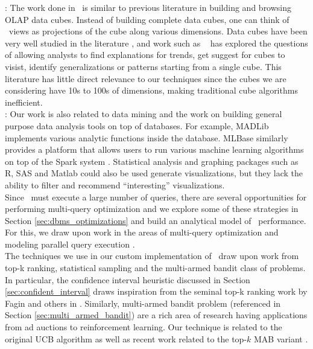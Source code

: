 :
The work done in \VizRecDB\ is similar to previous literature in
building and browsing OLAP data cubes. 
Instead of building complete data cubes,
one can think of \VizRecDB\ views as projections of the cube along various
dimensions.
 Data cubes have been very well studied in the literature
\cite{DBLP:conf/SIGMOD/HarinarayanRU96, DBLP:jounral/DMKD/GrayCBLR97}, and work such as
~\cite{DBLP:conf/vldb/Sarawagi99, DBLP:conf/vldb/SatheS01,
DBLP:conf/vldb/Sarawagi00, DBLP:conf/SIGKDD/OrdonezC09} has explored the
questions of allowing analysts to find explanations for trends, get suggest for
cubes to visist, identify generalizations or patterns starting from a single
cube. 
This literature has little direct relevance to our techniques since the cubes we
are considering have 10s to 100s of dimensions, making traditional cube
algorithms inefficient. \\

:
Our work is also related to data mining and the work on building general purpose
data analysis tools on top of databases. 
For example, MADLib \cite{DBLP:conf/VLDB/HellersteinRSWF12}
implements various analytic functions inside the database. 
MLBase similarly
\cite{DBLP:conf/CIDR/KraskaTDGFJ2013} provides a platform that allows users to
run various machine learning algorithms on top of the Spark system
\cite{DBLP:conf/SCC/ZahariaCFSS10}.
Statistical analysis and graphing packages such as R, SAS and Matlab could also
be used generate visualizations, but they lack the ability to filter and
recommend ``interesting'' visualizations. \\


Since \VizRecDB\ must execute a large number of queries, there are several
opportunities for performing multi-query optimization and we explore some of
these strategies in Section \ref{sec:dbms_optimizations} and build an analytical model of
\VizRecDB\ performance. For this, we draw upon work in the areas of multi-query
optimization and modeling parallel query execution \cite{DBLP:conf/VLDB/WuCHN13,
DBLP:journal/TODS/Sellis1988, DBLP:conf/VLDB/ZukowskiHNB07}. \\

The techniques we use in our custom implementation of \VizRecDB\ draw upon work
from top-k ranking, statistical sampling and the multi-armed bandit class of
problems. 
In particular, the confidence interval heuristic discussed in Section
\ref{sec:confident_interval} draws inspiration from the seminal top-k ranking work by Fagin and others in
\cite{DBLP:conf/pods/FaginLN01, DBLP:conf/vldb/IlyasAE04}.
Similarly, multi-armed bandit problem (referenced in Section
\ref{sec:multi_armed_bandit}) are a rich area of research having applications from ad auctions to reinforcement learning. 
Our technique is related to the original UCB algorithm \cite{AuerCF02, LaiR85}
as well as recent work related to the top-$k$ MAB variant \cite{BubeckWV13,
audibert2010best}.



